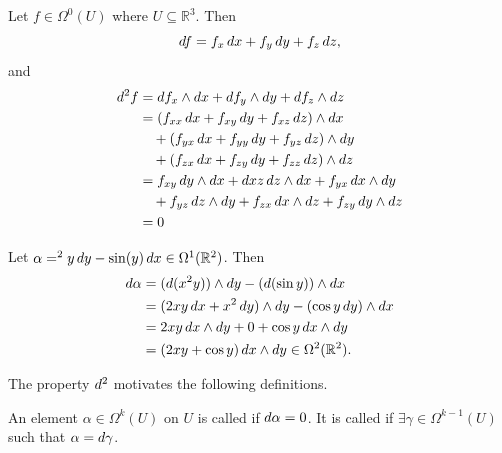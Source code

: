 \documentclass[notoc,notitlepage]{tufte-book}
\begin{document}
\begin{eg}
  Let $f \in \Omega^0(U)$ where $U \subseteq \mathbb{R}^3$. Then
  \begin{equation*}
    \mathop{}\!d{f} = f_x \mathop{}\!d{x} + f_y \mathop{}\!d{y} + f_z \mathop{}\!d{z},
  \end{equation*}
  and
  \begin{align*}
    \dif{^2 f} &= \dif{f_x} \land \dif{x} + \dif{f_y} \land \dif{y} + \dif{f_z} \land
                \dif{z} \\
               &= (f_{xx} \dif{x} + f_{xy} \dif{y} + f_{xz} \dif{z}) \land \dif{x} \\
               &\quad + (f_{yx} \dif{x} + f_{yy} \dif{y} + f_{yz} \dif{z}) \land \dif{y} \\
               &\quad + (f_{zx} \dif{x} + f_{zy} \dif{y} + f_{zz} \dif{z}) \land \dif{z} \\
               &= f_{xy} \dif{y} \land \dif{x} + \dif{xz} \dif{z} \land \dif{x} + f_{yx}
                \dif{x} \land \dif{y} \\
               &\quad + f_{yz} \dif{z} \land \dif{y} + f_{zx} \dif{x} \land \dif{z} +
                f_{zy} \dif{y} \land \dif{z} \\
               &= 0
  \end{align*}
\end{eg}

\begin{eg}
  Let $\alpha = ^2 y \mathop{}\!d{y} - \sin (y) \mathop{}\!d{x} \in \Omega^1(\mathbb{R}^2)$. Then
  \begin{align*}
    \dif{\alpha} &= (\dif{(x^2 y)}) \land \dif{y} - (\dif{(\sin y)}) \land \dif{x} \\
                 &= (2xy \dif{x} + x^2 \dif{y}) \land \dif{y} - (\cos y \dif{y}) \land
                  \dif{x} \\
                 &= 2xy \dif{x} \land \dif{y} + 0 + \cos y \dif{x} \land \dif{y} \\
                 &= (2xy + \cos y) \dif{x} \land \dif{y} \in \Omega^2(\mathbb{R}^2).
  \end{align*}
\end{eg}

The property $\mathop{}\!d{^2}$ motivates the following definitions.

\begin{defn}\label{defn:closed_and_exact_forms}
  An element $\alpha \in \Omega^k(U)$ on $U$ is called  if $\mathop{}\!d{\alpha} =
  0$. It is called  if $\exists \gamma \in \Omega^{k - 1}(U)$ such that
  $\alpha = \mathop{}\!d{\gamma}$.
\end{defn}
\end{document}
